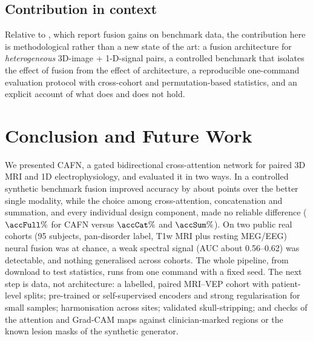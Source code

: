 \subsection{Contribution in context}
Relative to \cite{zhou2024camf,dhar2025drifa}, which report fusion gains on benchmark data, the contribution here is methodological rather than a new state of the art: a fusion architecture for \emph{heterogeneous} 3D-image + 1-D-signal pairs, a controlled benchmark that isolates the effect of fusion from the effect of architecture, a reproducible one-command evaluation protocol with cross-cohort and permutation-based statistics, and an explicit account of what does and does not hold.

\section{Conclusion and Future Work}\label{sec:conclusion}
We presented CAFN, a gated bidirectional cross-attention network for paired 3D MRI and 1D electrophysiology, and evaluated it in two ways. In a controlled synthetic benchmark fusion improved accuracy by about \gainUni{} points over the better single modality, while the choice among cross-attention, concatenation and summation, and every individual design component, made no reliable difference ($\accFull\%$ for CAFN versus $\accCat\%$ and $\accSum\%$). On two public real cohorts (95 subjects, pan-disorder label, T1w MRI plus resting MEG/EEG) neural fusion was at chance, a weak spectral signal (AUC about 0.56--0.62) was detectable, and nothing generalised across cohorts. The whole pipeline, from download to test statistics, runs from one command with a fixed seed. The next step is data, not architecture: a labelled, paired MRI--VEP cohort with patient-level splits; pre-trained or self-supervised encoders and strong regularisation for small samples; harmonisation across sites; validated skull-stripping; and checks of the attention and Grad-CAM maps against clinician-marked regions or the known lesion masks of the synthetic generator.
